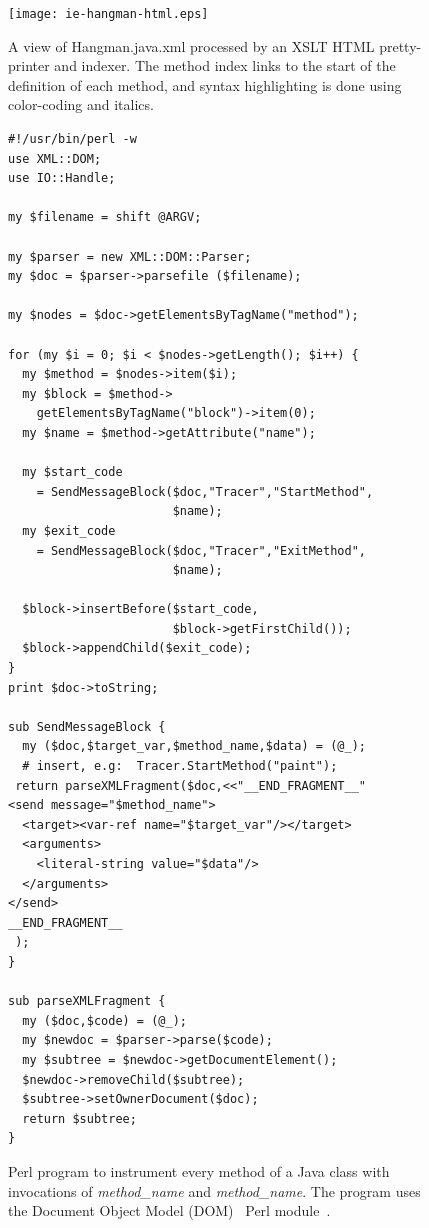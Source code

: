 \documentclass{article}
\begin{document}
\begin{multicols}{2}
\begin{figure}[htbp]
\begin{minipage}[b]{0.4\linewidth}
\texttt{[image: ie-hangman-html.eps]}
\caption{A view of Hangman.java.xml processed by an XSLT HTML pretty-printer and
  indexer.  The method index links to the start of the definition of each method, and 
  syntax highlighting is done using color-coding and italics.
\label{fig:ie-hangman-html}}
\end{minipage}%
\hspace*{15pt}
\begin{minipage}[b]{0.55\linewidth}
{\small
\begin{verbatim}
#!/usr/bin/perl -w
use XML::DOM;
use IO::Handle;

my $filename = shift @ARGV;

my $parser = new XML::DOM::Parser;
my $doc = $parser->parsefile ($filename);

my $nodes = $doc->getElementsByTagName("method");

for (my $i = 0; $i < $nodes->getLength(); $i++) {
  my $method = $nodes->item($i);
  my $block = $method->
    getElementsByTagName("block")->item(0);
  my $name = $method->getAttribute("name");

  my $start_code
    = SendMessageBlock($doc,"Tracer","StartMethod",
                       $name);
  my $exit_code 
    = SendMessageBlock($doc,"Tracer","ExitMethod",
                       $name);

  $block->insertBefore($start_code,
                       $block->getFirstChild());
  $block->appendChild($exit_code);
}
print $doc->toString;

sub SendMessageBlock {
  my ($doc,$target_var,$method_name,$data) = (@_);
  # insert, e.g:  Tracer.StartMethod("paint");
 return parseXMLFragment($doc,<<"__END_FRAGMENT__"
<send message="$method_name">
  <target><var-ref name="$target_var"/></target>
  <arguments>
    <literal-string value="$data"/>
  </arguments>
</send>  
__END_FRAGMENT__
 );
}

sub parseXMLFragment {
  my ($doc,$code) = (@_);
  my $newdoc = $parser->parse($code);
  my $subtree = $newdoc->getDocumentElement();
  $newdoc->removeChild($subtree);
  $subtree->setOwnerDocument($doc);
  return $subtree;
}
\end{verbatim}
}
\caption{Perl program to instrument every method of a Java class with invocations of
  \textit{method\_name}\smtexttt{)} and
  \textit{method\_name}\smtexttt{)}.  The
  program uses the Document Object Model (DOM)~\cite{DOM} Perl
  module~\cite{perlDOM}.
\label{fig:dom-instrument}}
\end{minipage}
\end{figure}


\end{multicols}
\end{document}
